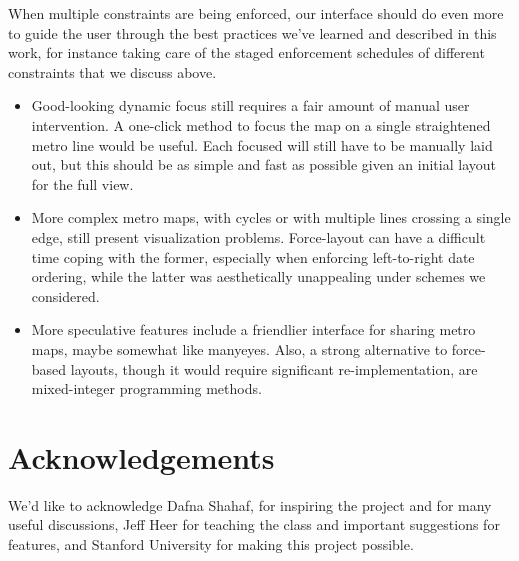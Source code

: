 \documentclass{chi2009}
\begin{document}
When multiple constraints are being enforced, our interface should do even more to guide the user through the best practices we’ve learned and described in this work, for instance taking care of the staged enforcement schedules of different constraints that we discuss above.

\begin{itemize}
    \item       Good-looking dynamic focus still requires a fair amount of manual user intervention. A one-click method to focus the map on a single straightened metro line would be useful. Each focused will still have to be manually laid out, but this should be as simple and fast as possible given an initial layout for the full view.
    \item       More complex metro maps, with cycles or with multiple lines crossing a single edge, still present visualization problems. Force-layout can have a difficult time coping with the former, especially when enforcing left-to-right date ordering, while the latter was aesthetically unappealing under schemes we considered.
    \item       More speculative features include a friendlier interface for sharing metro maps, maybe somewhat like manyeyes. Also, a strong alternative to force-based layouts, though it would require significant re-implementation, are mixed-integer programming methods.  
\end{itemize}

\section{Acknowledgements}

We'd like to acknowledge Dafna Shahaf, for inspiring the project and for many useful discussions, Jeff Heer for teaching the class and important suggestions for features, and Stanford University for making this project possible.



\end{document}
